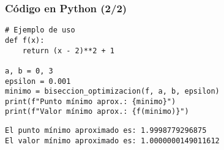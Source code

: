 \documentclass{beamer}
\begin{document}
\begin{frame}[fragile]
\frametitle{Código en Python (2/2)}
\begin{verbatim}
# Ejemplo de uso
def f(x):
    return (x - 2)**2 + 1

a, b = 0, 3
epsilon = 0.001
minimo = biseccion_optimizacion(f, a, b, epsilon)
print(f"Punto mínimo aprox.: {minimo}")
print(f"Valor mínimo aprox.: {f(minimo)}")
\end{verbatim}

\begin{verbatim}
El punto mínimo aproximado es: 1.9998779296875
El valor mínimo aproximado es: 1.0000000149011612
\end{verbatim}
\end{frame}

\backmatter
\end{document}
